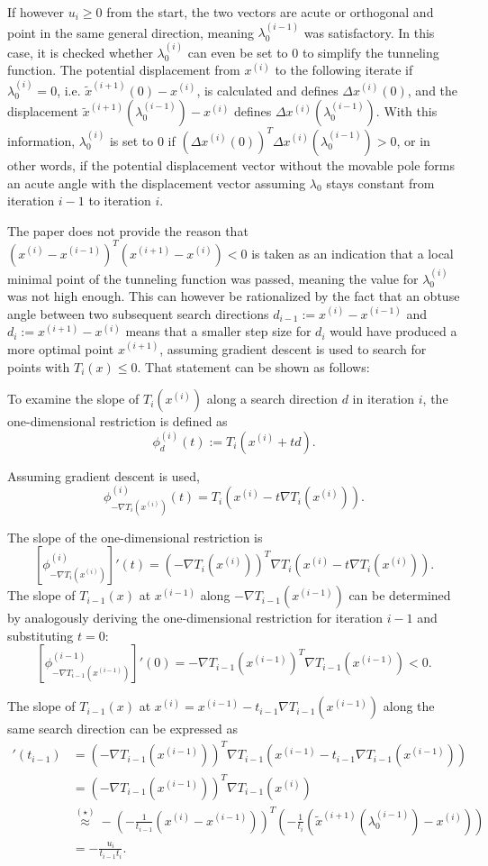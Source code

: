 \documentclass[a4paper,12pt,twoside]{article}
\begin{document}
If however $u_i \geq 0$ from the start, the two vectors are acute or orthogonal and point in the same general direction, meaning $\lambda_0^{(i-1)}$ was satisfactory. In this case, it is checked whether $\lambda_0^{(i)}$ can even be set to $0$ to simplify the tunneling function. The potential displacement from $x^{(i)}$ to the following iterate if $\lambda_0^{(i)} = 0$, i.e. $\tilde x^{(i+1)}(0) - x^{(i)}$, is calculated and defines $\Delta x^{(i)}(0)$, and the displacement $\tilde x^{(i+1)}(\lambda_0^{(i-1)}) - x^{(i)}$ defines $\Delta x^{(i)}(\lambda_0^{(i-1)})$. With this information, $\lambda_0^{(i)}$ is set to $0$ if $(\Delta x^{(i)}(0))^T\Delta x^{(i)}(\lambda_0^{(i-1)}) > 0$, or in other words, if the potential displacement vector without the movable pole forms an acute angle with the displacement vector assuming $\lambda_0^{}$ stays constant from iteration $i-1$ to iteration $i$. 

The paper does not provide the reason that $(x^{(i)}-x^{(i-1)})^T(x^{(i+1)} - x^{(i)}) < 0$ is taken as an indication that a local minimal point of the tunneling function was passed, meaning the value for $\lambda_0^{(i)}$ was not high enough. This can however be rationalized by the fact that an obtuse angle between two subsequent search directions $d_{i-1} := x^{(i)} - x^{(i-1)}$ and $d_{i} := x^{(i+1)} - x^{(i)}$ means that a smaller step size for $d_{i}$ would have produced a more optimal point $x^{(i+1)}$, assuming gradient descent is used to search for points with $T_i(x) \leq 0$. That statement can be shown as follows:

To examine the slope of $T_i(x^{(i)})$ along a search direction $d$ in iteration $i$, the one-dimensional restriction is defined as
\[
\phi_d^{(i)}(t) := T_i(x^{(i)}+td).
\]

Assuming gradient descent is used,
\[
\phi^{(i)}_{-\nabla T_i(x^{(i)})}(t) = T_i(x^{(i)} - t \nabla T_i(x^{(i)})).
\]

The slope of the one-dimensional restriction is
\[
[\phi^{(i)}_{-\nabla T_i(x^{(i)})}]'(t) = (-\nabla T_i(x^{(i)}))^T \nabla T_i(x^{(i)} - t  \nabla T_i(x^{(i)})).
\]
The slope of $T_{i-1}(x)$ at $x^{(i-1)}$ along $-\nabla T_{i-1}(x^{(i-1)})$ can be determined by analogously deriving the one-dimensional restriction for iteration $i-1$ and substituting $t=0$:
\[
[\phi^{(i-1)}_{-\nabla T_{i-1}(x^{(i-1)})}]'(0) = -\nabla T_{i-1}(x^{(i-1)})^T \nabla T_{i-1}(x^{(i-1)}) < 0.
\]

The slope of $T_{i-1}(x)$ at $x^{(i)} = x^{(i-1)} - t_{i-1}\nabla T_{i-1}(x^{(i-1)})$ along the same search direction can be expressed as 
\begin{align*}
[\phi^{(i-1)}_{-\nabla T_{i-1}(x^{(i-1)})}]'(t_{i-1}) &= (-\nabla T_{i-1}(x^{(i-1)}))^T \nabla T_{i-1}(x^{(i-1)} - t_{i-1}  \nabla T_{i-1}(x^{(i-1)})) \\
&= (-\nabla T_{i-1}(x^{(i-1)}))^T \nabla T_{i-1}(x^{(i)}) \\
&\stackrel{(\star)}{\approx} - \left( -\frac{1}{t_{i-1}}(x^{(i)}-x^{(i-1)}) \right) ^T \left( -\frac{1}{t_i} (\tilde x^{(i+1)}(\lambda_0^{(i-1)}) - x^{(i)}) \right) \\
&= -\frac{u_{i}}{t_{i-1}t_{i}}.
\end{align*}
\end{document}

